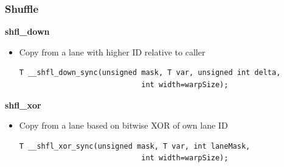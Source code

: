 \documentclass[aspectratio=169,handout]{beamer}
\begin{document}
\begin{frame}[fragile]
\frametitle{Shuffle}

\textbf{shfl\_down}
\begin{itemize}
	\item[] Copy from a lane with higher ID relative to caller
\begin{lstlisting}
T __shfl_down_sync(unsigned mask, T var, unsigned int delta, 
							int width=warpSize);
\end{lstlisting}
\end{itemize}

\textbf{shfl\_xor}
\begin{itemize}
	\item[] Copy from a lane based on bitwise XOR of own lane ID
\begin{lstlisting}
T __shfl_xor_sync(unsigned mask, T var, int laneMask, 
							int width=warpSize);
\end{lstlisting}
\end{itemize}

\end{frame}
\end{document}
